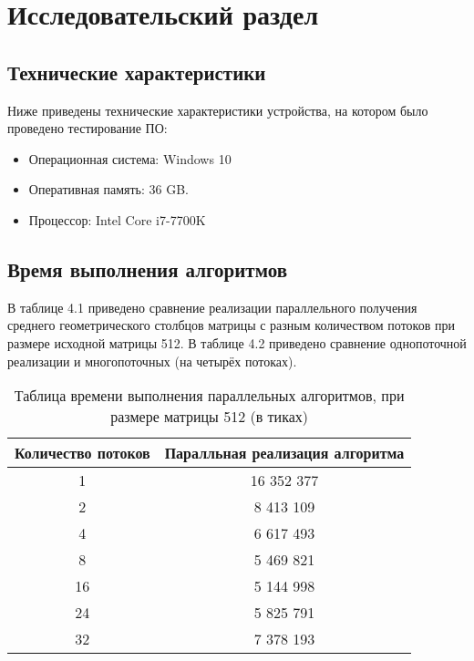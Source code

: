 \chapter{Исследовательский раздел}
\label{cha:research}
    
    \section{Технические характеристики}
    
    Ниже приведены технические характеристики устройства, на котором было проведено тестирование ПО:
    
    \begin{itemize}
    	\item Операционная система: Windows 10
    	\item Оперативная память: 36 GB.
    	\item Процессор: Intel Core i7-7700K
    
    \end{itemize}
    
    \section{Время выполнения алгоритмов}
    В таблице 4.1 приведено сравнение реализации параллельного получения среднего геометрического столбцов матрицы с разным количеством потоков при размере исходной матрицы 512. В таблице 4.2 приведено сравнение однопоточной реализации и многопоточных (на четырёх потоках).
    
    \begin{table} [h!]
    	\caption{Таблица времени выполнения параллельных алгоритмов, при размере матрицы 512 (в тиках)}
    	\begin{center}
    		\begin{tabular}{|c c|} 
    			\hline
    			Количество потоков & Паралльная реализация алгоритма \\
    			\hline
    			1 & 16 352 377\\
    			\hline
    			2 & 8 413 109\\
    			\hline
    			4 & 6 617 493\\
    			\hline
    			8 & 5 469 821 \\
    			\hline
    			16 & 5 144 998 \\
    			\hline
    			24 & 5 825 791 \\
    			\hline
    			32 & 7 378 193 \\
    			\hline
    		\end{tabular}
    	\end{center}
    \end{table}
    

